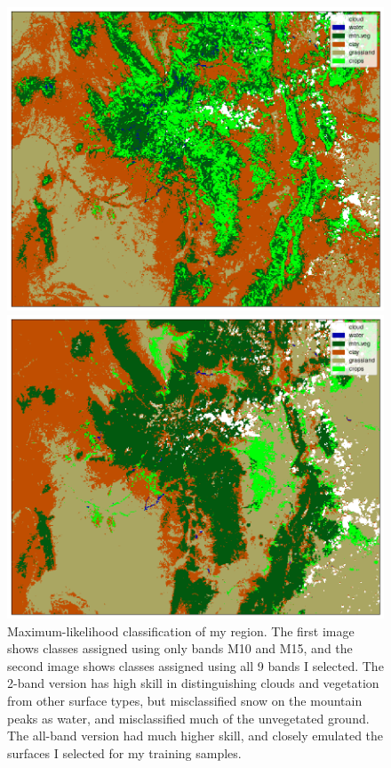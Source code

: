 \documentclass[12pt]{article}
\begin{document}
\begin{figure}[h!]
    \centering
    \includegraphics[width=.7\linewidth]{figures/p5/mlc_4+5_M10+M15.png}

    \vspace{.2em}
    \includegraphics[width=.7\linewidth]{figures/p5/mlc_4+5_M15+M14+M12+M10+M09+M07+M05+M04+M03.png}
    \caption{Maximum-likelihood classification of my region. The first image shows classes assigned using only bands M10 and M15, and the second image shows classes assigned using all 9 bands I selected. The 2-band version has high skill in distinguishing clouds and vegetation from other surface types, but misclassified snow on the mountain peaks as water, and misclassified much of the unvegetated ground. The all-band version had much higher skill, and closely emulated the surfaces I selected for my training samples.}
    \label{p5_mlc}
\end{figure}
\end{document}
